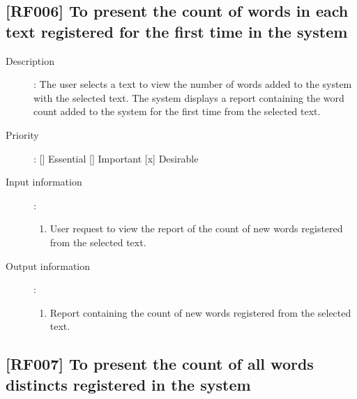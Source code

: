 \documentclass[11pt, twoside, a4paper]{book}
\begin{document}
			\subsection{[RF006] To present the count of words in each text registered for the first time in the system}
				
				\begin{description}
				
					\item[Description]: The user selects a text to view the number of words added to the system with the selected text. The system displays a report containing the word count added to the system for the first time from the selected text.
					\item[Priority]: [] Essential [] Important [x] Desirable
					\item[Input information]:
						\begin{enumerate}

							\item User request to view the report of the count of new words registered from the selected text.
							
						\end{enumerate}
					\item[Output information]:
						\begin{enumerate}
						
							\item Report containing the count of new words registered from the selected text.
																					
						\end{enumerate}
	
				\end{description}

			\subsection{[RF007] To present the count of all words distincts registered in the system}
				
\end{document}
